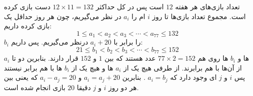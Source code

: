\p
تعداد بازی‌های هر هفته
$12$
است پس در کل حداکثر
$12 \times 11 = 132$
دست بازی کرده است. مجموع تعداد بازی‌ها تا روز
$i$
ام را
$a_i$
در نظر می‌گیریم، چون هر روز حداقل یک بازی کرده داریم:
$$1 \leq a_1 < a_2 < a_3 < \cdots < a_{77} \leq 132$$
$b_i$
را برابر با
$a_i + 20$
درنظر می‌گیریم. پس داریم:
$$21 \leq b_1 < b_2 < b_3 < \cdots < b_{77} \leq 152$$
$a_i$
ها و
$b_i$
ها روی هم
$77 \times 2 = 152$
عدد هستند که بین
$1$
و
$152$
قرار دارند. بنابرین دو تا از آن‌ها با هم برابرند. از طرفی هیچ یک از
$a_i$
ها و هیچ یک از
$b_i$
ها با هم برابر نیستند پس
$i$
و
$j$
ای وجود دارد که
$a_i = b_j$
. بنابرین
$a_i = a_j + 20$
و
$a_i - a_j = 20$
که یعنی بین هر دو روز
$i$
و
$j$
دقیقا
$20$
بازی انجام شده است.